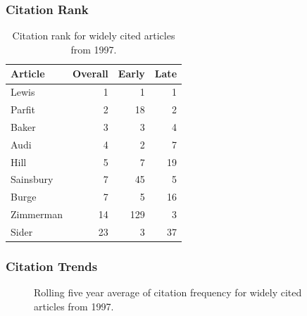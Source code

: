 \documentclass[
  10pt,
  letterpaper,
  DIV=11,
  numbers=noendperiod,
  twoside]{scrartcl}
\begin{document}
\subsubsection*{Citation Rank}\label{sec-rank-1997}

\begin{longtable}[]{@{}lrrr@{}}

\caption{\label{tbl-citation-rank-1997}Citation rank for widely cited
articles from 1997.}

\tabularnewline

\toprule\noalign{}
Article & Overall & Early & Late \\
\midrule\noalign{}
\endhead
\bottomrule\noalign{}
\endlastfoot
Lewis & 1 & 1 & 1 \\
Parfit & 2 & 18 & 2 \\
Baker & 3 & 3 & 4 \\
Audi & 4 & 2 & 7 \\
Hill & 5 & 7 & 19 \\
Sainsbury & 7 & 45 & 5 \\
Burge & 7 & 5 & 16 \\
Zimmerman & 14 & 129 & 3 \\
Sider & 23 & 3 & 37 \\

\end{longtable}

\subsubsection*{Citation Trends}\label{sec-trends-1997}

\begin{figure}


\caption{\label{fig-citation-spaghetti-1997}Rolling five year average of
citation frequency for widely cited articles from 1997.}

\end{figure}%
\end{document}
